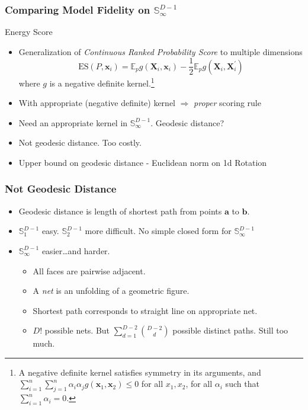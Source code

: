 \documentclass[aspectratio=169,10pt]{beamer}
\begin{document}
\begin{frame}
    \frametitle{Comparing Model Fidelity on $\mathbb{S}_{\infty}^{D-1}$}
    Energy Score~\cite{gneiting2007}
    \begin{itemize}
    \item Generalization of \emph{Continuous Ranked Probability Score} 
        to multiple dimensions
        \[
        \text{ES}\left(P,\bm{x}_i\right) =  
            \mathbb{E}_p g\left(\bm{X}_i, \bm{x}_i\right)
            - \frac{1}{2}\mathbb{E}_p g\left(\bm{X}_i,\bm{X}_i^{\prime}\right)
        \]
        where $g$ is a negative definite kernel.\footnote{A negative 
        definite kernel satisfies symmetry in its arguments, and 
        $\sum_{i = 1}^n\sum_{j = 1}^n \alpha_i\alpha_j g(\bm{x}_1,\bm{x}_2) \leq 0$ 
        for all $x_1,x_2$, for all $\alpha_i$ such that $\sum_{i = 1}^n\alpha_i = 0$.
        }
    \item With appropriate (negative definite) kernel 
        $\Longrightarrow$ \emph{proper} scoring rule
    \item Need an appropriate kernel in $\mathbb{S}_{\infty}^{D-1}$.  Geodesic distance?
    \item Not geodesic distance.  Too costly.
    \item Upper bound on geodesic distance - Euclidean norm on 1d Rotation
    \end{itemize}
\end{frame} %

\begin{frame}
    \frametitle{Not Geodesic Distance}
    \begin{itemize}
        \item Geodesic distance is length of shortest path from points $\bm{a}$ to $\bm{b}$.
        \item $\mathbb{S}_1^{D-1}$ easy.  $\mathbb{S}_2^{D-1}$ more difficult. 
            No simple closed form for $\mathbb{S}_{\infty}^{D-1}$
        \item $\mathbb{S}_{\infty}^{D-1}$ easier\ldots and harder.
        \begin{itemize}
            \item All faces are pairwise adjacent.
            \item A \emph{net} is an unfolding of a geometric figure.  
            \item Shortest path corresponds to straight line on appropriate net.
            \item $D!$ possible nets.  But $\sum_{d = 1}^{D-2}\binom{D-2}{d}$ 
                possible distinct paths.  Still too much.
        \end{itemize}
    \end{itemize}
\end{frame} %
\end{document}
